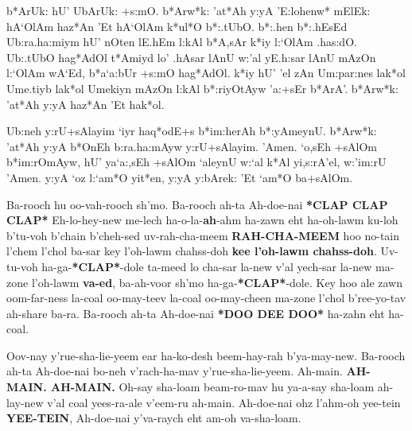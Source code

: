 \documentclass[12pt]{article}
\newenvironment{hebrewPrayer}
    {\begin{cjhebrew}
     \Large
    }
    {
    \end{cjhebrew}
    }
\newenvironment{hebrewTransliteration}{}{\par}
\newcommand{\hebrewVowelOh}{\textrm{\hspace{0.2em}}o\textrm{\hspace{-0.2em}}}
\newcommand{\hebrewVowelDotDotL}{e} %
\newcommand{\transliterateAdonai}{Ah-doe-nai}
\newcommand{\baruchAdonai}{b*Arw*k: 'at*Ah y:yA}
\newcommand{\transliterateBaruchAdonai}{Ba-rooch ah-ta {\transliterateAdonai}}
\newcommand{\baruchHaolam}{{\baruchAdonai} 'E:loh{\hebrewVowelDotDotL}nw* mElEk: hA`OlAm}
\begin{document}
\begin{hebrewPrayer}
    b*ArUk: hU' UbArUk: +s:mO\textrm{.} {\baruchHaolam} haz*An 'Et hA`OlAm k*ul*O b*:.tUbO\textrm{.} b*:.hen b*:.hEsEd Ub:ra.ha:miym hU' nOten lE.hEm l:kAl b*A,sAr k*iy l:`OlAm .has:dO\textrm{.} Ub:.tUbO hag*AdOl t*Amiyd \hbox{l{\hebrewVowelOh}'} .hAsar lAnU w:'al yE.h:sar lAnU mAzOn l:`OlAm wA`Ed\textrm{,} b*a`a:bUr +s:mO hag*AdOl\textrm{.} k*iy hU' 'el zAn Um:par:nes \hbox{lak*{\hebrewVowelOh}l} Ume.tiyb \hbox{lak*{\hebrewVowelOh}l} Umekiyn mAzOn l:kAl b*:riyOtAyw 'a:+sEr b*ArA'\textrm{.} {\baruchAdonai} haz*An 'Et \hbox{hak*{\hebrewVowelOh}l}\textrm{.}

    Ub:neh y:rU+sAlayim `iyr \hbox{haq*{\hebrewVowelOh}dE+s} b*im:herAh b*:yAmeynU\textrm{.} {\baruchAdonai} b*OnEh b:ra.ha:mAyw y:rU+sAlayim\textrm{.} 'Amen\textrm{.} \hbox{`{\hebrewVowelOh},sEh} +sAlOm b*im:rOmAyw\textrm{,} hU' ya`a:,sEh +sAlOm `aleynU w:`al k*Al yi,s:rA'el\textrm{,} w:'im:rU 'Amen\textrm{.} y:yA \hbox{`{\hebrewVowelOh}z} l:`am*O yit*en\textrm{,} y:yA y:bArek: 'Et `am*O ba+sAlOm\textrm{.}

\end{hebrewPrayer}

\begin{hebrewTransliteration}
    Ba-rooch hu oo-vah-rooch sh'mo. {\transliterateBaruchAdonai} \textbf{*CLAP CLAP CLAP*} Eh-lo-hey-new me-lech ha-o-la-\textbf{ah}-ahm ha-zawn eht ha-oh-lawm ku-loh b'tu-voh b'chain b'cheh-sed uv-rah-cha-meem \textbf{RAH-CHA-MEEM} hoo no-tain l'chem l'chol ba-sar key l'oh-lawm chahss-doh \textbf{kee l'oh-lawm chahss-doh}. Uv-tu-voh ha-ga-\textbf{*CLAP*}-dole ta-meed lo cha-sar la-new v'al yech-sar la-new ma-zone l'oh-lawm \textbf{va-ed}, ba-ah-voor sh'mo ha-ga-\textbf{*CLAP*}-dole. Key hoo ale zawn oom-far-ness la-coal oo-may-teev la-coal oo-may-cheen ma-zone l'chol b'ree-yo-tav ah-share ba-ra. {\transliterateBaruchAdonai} \textbf{*DOO DEE DOO*} ha-zahn eht ha-coal.

    Oov-nay y'rue-sha-lie-yeem ear ha-ko-desh beem-hay-rah b'ya-may-new. {\transliterateBaruchAdonai} bo-neh v'rach-ha-mav y'rue-sha-lie-yeem. Ah-main. \textbf{AH-MAIN. AH-MAIN.} Oh-say sha-loam beam-ro-mav hu ya-a-say sha-loam ah-lay-new v'al coal yees-ra-ale v'eem-ru ah-main. {\transliterateAdonai} ohz l'ahm-oh yee-tein \textbf{YEE-TEIN}, {\transliterateAdonai} y'va-raych eht am-oh va-sha-loam.
\end{hebrewTransliteration}
\end{document}
